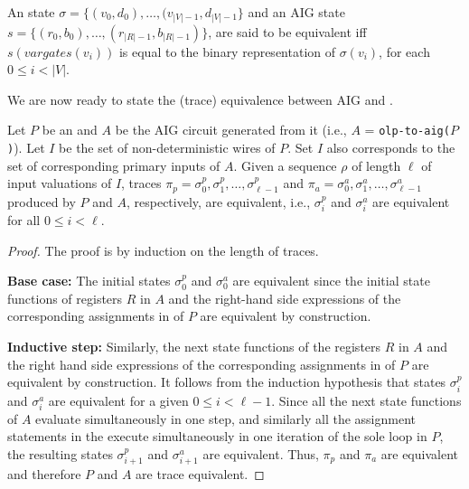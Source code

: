 %
\begin{definition}
  An \caig state $\sigma=\{(v_0,d_0),\ldots,(v_{|V|-1},d_{|V|-1}\}$ and an AIG state $s=\{(r_0,b_0),\ldots,(r_{|R|-1}, b_{|R|-1})\}$, 
  are said to be equivalent iff
  $s(vargates(v_i))$ is equal to the binary representation of $\sigma(v_i)$, for each $0\le i < |V|$. 
\end{definition}

We are now ready to state the (trace) equivalence between AIG and \caig.

\begin{theorem}
Let $P$ be an \caig and $A$ be the AIG circuit generated from it (i.e., $A$ = \texttt{olp-to-aig($P$)}). 
Let $I$ be the set of non-deterministic wires of $P$. 
Set $I$ also corresponds to the set of corresponding primary 
inputs of $A$. 
Given a sequence $\rho$ of length $\ell$ 
of input valuations of $I$, traces 
$\pi_p=\sigma^p_{0}, \sigma^p_{1}, \ldots, \sigma^p_{\ell-1}$ 
and 
$\pi_a=\sigma^a_{0}, \sigma^a_{1}, \ldots, \sigma^a_{\ell-1}$ 
produced by $P$ and $A$, 
respectively, are equivalent, i.e., $\sigma^p_{i}$ and $\sigma^a_i$ are
equivalent for all $0 \le i < \ell$. 
\end{theorem}


\begin{proof}
The proof is by induction on the length of traces. 

{\bf Base case:} 
The initial states $\sigma^p_{0}$ and 
$\sigma^a_{0}$ are equivalent since the 
initial state functions of registers $R$ in $A$ and 
the right-hand side expressions of the corresponding
assignments in  of $P$ are equivalent
by construction. 

{\bf Inductive step:} 
Similarly, the next state functions of the registers $R$ in $A$ 
and the right hand side expressions of the corresponding
assignments in  of $P$ are equivalent
by construction. 
It follows from the induction hypothesis 
that states $\sigma^p_{i}$ and $\sigma^a_{i}$ are 
equivalent for a given $0\le i < \ell -1$.
Since all the next state functions of $A$ 
evaluate simultaneously in one step,
and similarly all the assignment statements in the 
 execute simultaneously in one iteration of the 
sole loop in $P$, 
the resulting states $\sigma^p_{i+1}$ and $\sigma^a_{i+1}$ 
are equivalent. 
Thus, $\pi_p$ and $\pi_a$ are equivalent and therefore 
$P$ and $A$ are trace equivalent. 
\end{proof}

